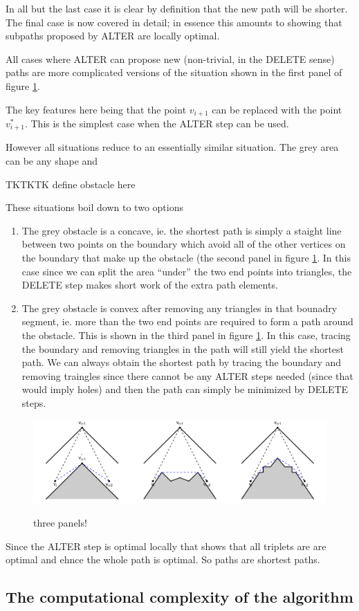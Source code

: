 In all but the last case it is clear by definition that the new path will be shorter. The final case is now covered in detail; in essence this amounts to showing that subpaths proposed by ALTER are locally optimal.

All cases where ALTER can propose new (non-trivial, in the DELETE sense) paths are more complicated versions of the situation shown in the first panel of figure \ref{app-WAD-alterstep-dia}. 


The key features here being that the point $v_{i+1}$ can be replaced with the point $v_{i+1}^*$. This is the simplest case when the ALTER step can be used. 

However all situations reduce to an essentially similar situation. The grey area can be any shape and 


TKTKTK define obstacle here

These situations boil down to two options
\begin{enumerate}
   \item The grey obstacle is a concave, ie. the shortest path is simply a staight line between two points on the boundary which avoid all of the other vertices on the boundary that make up the obstacle (the second panel in figure \ref{app-WAD-alterstep-dia}. In this case since we can split the area ``under'' the two end points into triangles, the DELETE step makes short work of the extra path elements.
   \item The grey obstacle is convex after removing any triangles in that bounadry segment, ie. more than the two end points are required to form a path around the obstacle. This is shown in the third panel in figure \ref{app-WAD-alterstep-dia}. In this case, tracing the boundary and removing triangles in the path will still yield the shortest path. We can always obtain the shortest path by tracing the boundary and removing traingles since there cannot be any ALTER steps needed (since that would imply holes) and then the path can simply be minimized by DELETE steps.
\end{enumerate}


\begin{figure}
\centering
\includegraphics[width=6in]{app-WAD/figs/alterstep-proof.pdf} \\
\caption{three panels!}
\label{app-WAD-alterstep-dia}
\end{figure}


Since the ALTER step is optimal locally that shows that all triplets are are optimal and ehnce the whole path is optimal. So paths are shortest paths.



\subsection{The computational complexity of the algorithm}





